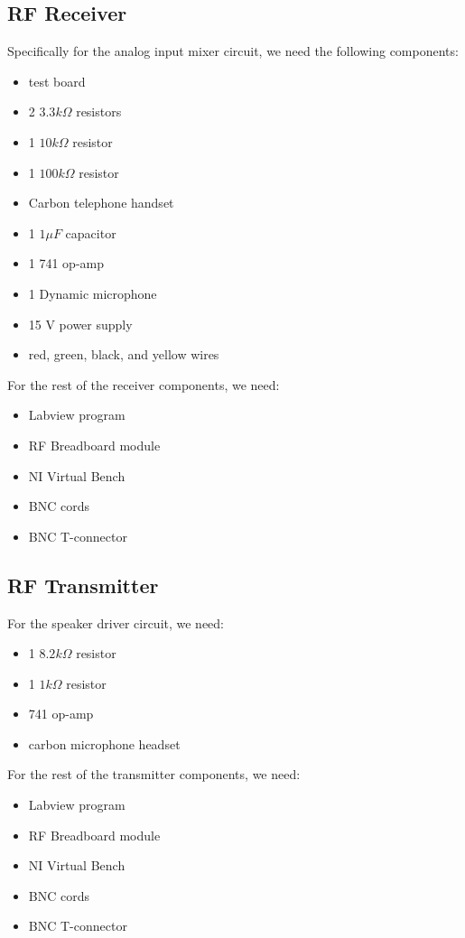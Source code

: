 \documentclass[10pt]{article}
\begin{document}
\subsection{RF Receiver}
Specifically for the analog input mixer circuit, we need the following components:
\begin{itemize}
	\item test board
	\item 2 $3.3k\Omega$ resistors
	\item 1 $10 k\Omega$ resistor
	\item 1 $100k\Omega$ resistor
	\item Carbon telephone handset
	\item 1 $1\mu F$ capacitor
	\item 1 741 op-amp
	\item 1 Dynamic microphone
	\item 15 V power supply
	\item red, green, black, and yellow wires
\end{itemize}
\noindent
For the rest of the receiver components, we need:
\begin{itemize}
	\item Labview program
	\item RF Breadboard module
	\item NI Virtual Bench 
	\item BNC cords
	\item BNC T-connector 
\end{itemize}

\subsection{RF Transmitter}
For the speaker driver circuit, we need:
\begin{itemize}
	\item 1 $8.2 k\Omega$ resistor
	\item 1 $1 k\Omega$ resistor
	\item 741 op-amp
	\item carbon microphone headset
\end{itemize}
\noindent
For the rest of the transmitter components, we need:
\begin{itemize}
	\item Labview program
	\item RF Breadboard module
	\item NI Virtual Bench 
	\item BNC cords
	\item BNC T-connector 
\end{itemize}
\end{document}
